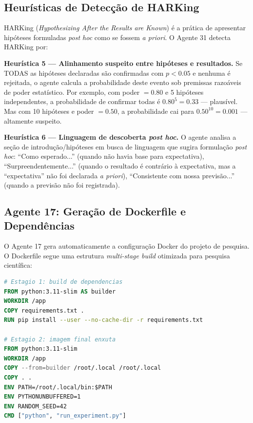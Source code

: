 \subsection{Heurísticas de Detecção de HARKing}
\label{sec:harking}

HARKing (\textit{Hypothesizing After the Results are Known}) é a
prática de apresentar hipóteses formuladas \textit{post hoc} como
se fossem \textit{a priori}. O Agente 31 detecta HARKing por:

\textbf{Heurística 5 — Alinhamento suspeito entre hipóteses e
resultados.} Se TODAS as hipóteses declaradas são confirmadas com
$p < 0.05$ e nenhuma é rejeitada, o agente calcula a probabilidade
deste evento sob premissas razoáveis de poder estatístico. Por
exemplo, com poder $= 0.80$ e 5 hipóteses independentes, a
probabilidade de confirmar todas é $0.80^5 = 0.33$ — plausível. Mas
com 10 hipóteses e poder $= 0.50$, a probabilidade cai para
$0.50^{10} = 0.001$ — altamente suspeito.

\textbf{Heurística 6 — Linguagem de descoberta \textit{post hoc}.}
O agente analisa a seção de introdução/hipóteses em busca de
linguagem que sugira formulação \textit{post hoc}: ``Como
esperado...'' (quando não havia base para expectativa),
``Surpreendentemente...'' (quando o resultado é contrário à
expectativa, mas a ``expectativa'' não foi declarada \textit{a
priori}), ``Consistente com nossa previsão...'' (quando a previsão
não foi registrada).


\subsection{Agente 17: Geração de Dockerfile e Dependências}
\label{sec:agente17_docker}

O Agente 17 gera automaticamente a configuração Docker do projeto
de pesquisa. O Dockerfile segue uma estrutura \textit{multi-stage
build} otimizada para pesquisa científica:

\begin{lstlisting}[language=Dockerfile, caption={Dockerfile para projeto científico gerado pelo Agente 17}, label={lst:dockerfile}, basicstyle=\ttfamily\footnotesize]
# Estagio 1: build de dependencias
FROM python:3.11-slim AS builder
WORKDIR /app
COPY requirements.txt .
RUN pip install --user --no-cache-dir -r requirements.txt

# Estagio 2: imagem final enxuta
FROM python:3.11-slim
WORKDIR /app
COPY --from=builder /root/.local /root/.local
COPY . .
ENV PATH=/root/.local/bin:$PATH
ENV PYTHONUNBUFFERED=1
ENV RANDOM_SEED=42
CMD ["python", "run_experiment.py"]
\end{lstlisting}

